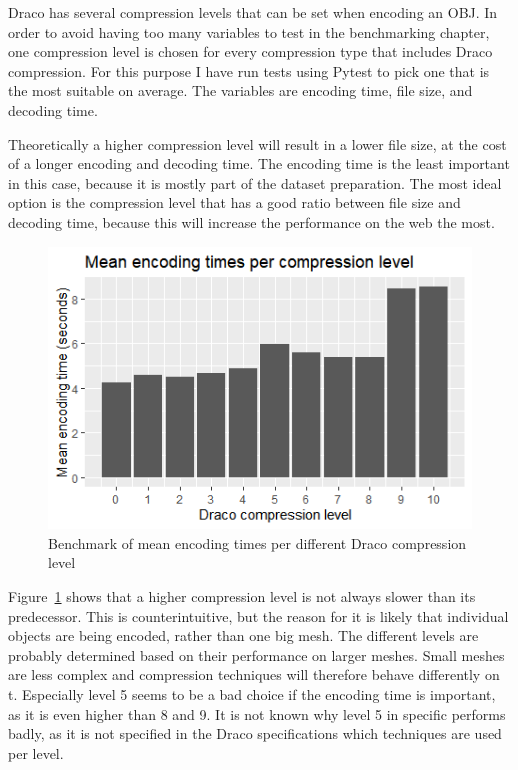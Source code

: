 Draco has several compression levels that can be set when encoding an OBJ.
In order to avoid having too many variables to test in the benchmarking chapter, one compression level is chosen for every compression type that includes Draco compression.
For this purpose I have run tests using Pytest to pick one that is the most suitable on average.
The variables are encoding time, file size, and decoding time.


Theoretically a higher compression level will result in a lower file size, at the cost of a longer encoding and decoding time.
The encoding time is the least important in this case, because it is mostly part of the dataset preparation.
The most ideal option is the compression level that has a good ratio between file size and decoding time, because this will increase the performance on the web the most.

\begin{figure}[h!]
    \includegraphics[scale=1]{figs/implementation/meanencodingtimes.png}
    \caption{Benchmark of mean encoding times per different Draco compression level}
    \label{fig:drcencodingtimes}
\end{figure}

Figure~\ref{fig:drcencodingtimes} shows that a higher compression level is not always slower than its predecessor.
This is counterintuitive, but the reason for it is likely that individual objects are being encoded, rather than one big mesh.
The different levels are probably determined based on their performance on larger meshes.
Small meshes are less complex and compression techniques will therefore behave differently on t.
Especially level 5 seems to be a bad choice if the encoding time is important, as it is even higher than 8 and 9.
It is not known why level 5 in specific performs badly, as it is not specified in the Draco specifications which techniques are used per level.

